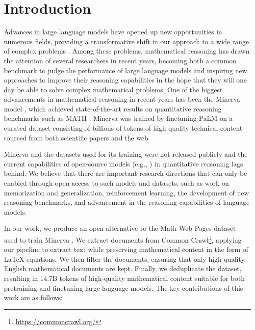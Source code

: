 \section{Introduction}
Advances in large language models have opened up new opportunities in numerous fields, providing a transformative shift in our approach to a wide range of complex problems \citep{gpt3, raffel2020exploring}. Among these problems, mathematical reasoning has drawn the attention of several researchers in recent years, becoming both a common benchmark to judge the performance of large language models and inspiring new approaches to improve their reasoning capabilities in the hope that they will one day be able to solve complex mathematical problems. One of the biggest advancements in mathematical reasoning in recent years has been the Minerva model \citep{lewkowycz2022solving}, which achieved state-of-the-art results on quantitative reasoning benchmarks such as MATH \citep{mathdataset}. Minerva was trained by finetuning PaLM \citep{palm} on a curated dataset consisting of billions of tokens of high quality technical content sourced from both scientific papers and the web.

Minerva and the datasets used for its training were not released publicly and the current capabilities of open-source models (e.g., \citet{touvron2023llama, llama2, codellama, openlm2023openllama, pythia}) in quantitative reasoning lags behind. We believe that there are important research directions that can only be enabled through open-access to such models and datasets, such as work on memorization and generalization, reinforcement learning, the development of new reasoning benchmarks, and advancement in the reasoning capabilities of language models.

In our work, we produce an open alternative to the Math Web Pages dataset used to train Minerva \citep{lewkowycz2022solving}. We extract documents from Common Crawl\footnote{\url{https://commoncrawl.org/}}, applying our pipeline to extract text while preserving mathematical content in the form of \LaTeX{} equations. We then filter the documents, ensuring that only high-quality English mathematical documents are kept. Finally, we deduplicate the dataset, resulting in 14.7B tokens of high-quality mathematical content suitable for both pretraining and finetuning large language models. The key contributions of this work are as follows:

